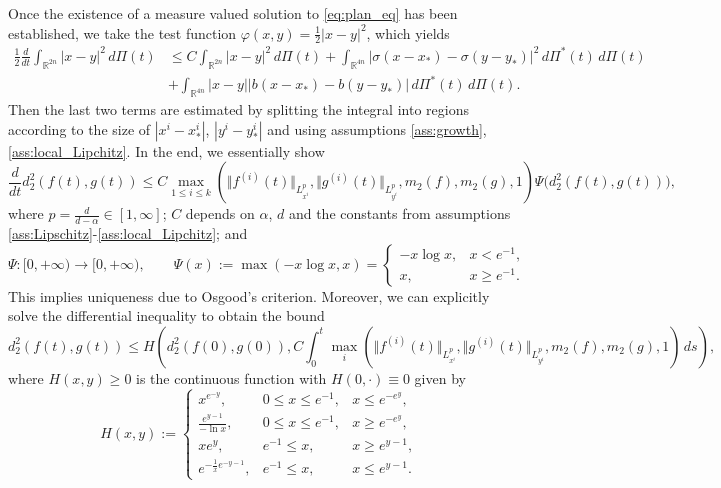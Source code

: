 \documentclass[10pt,oneside]{amsart}
\numberwithin{equation}{section}
\numberwithin{definition}{section}
\numberwithin{theorem}{section}
\numberwithin{lemma}{section}
\begin{document}
% 
Once the existence of a measure valued solution to \cref{eq:plan_eq} has been established, we take the test function ${\varphi(x,y)=\frac{1}{2}|x-y|^2}$, which yields
% 
\begin{align*}
  \frac{1}{2}\frac{d}{dt}\int_{\mathbb R^{2n}}|x-y|^{2}\,d\Pi(t)
  &\leq C\int_{\mathbb R^{2n}}|x-y|^{2}\,d\Pi(t)
  +\int_{\mathbb R^{4n}}\left|\sigma(x-x_{*})-\sigma(y-y_{*})\right|^{2}\,d\Pi^{*}(t)\,d\Pi(t)\\
  &+\int_{\mathbb R^{4n}}|x-y|\left|b(x-x_{*})-b(y-y_{*})\right|\,d\Pi^{*}(t)\,d\Pi(t).
\end{align*}
% 
Then the last two terms are estimated by splitting the integral into regions according to the size of $|x^i-x^i_*|$, $|y^i-y^i_*|$ and using assumptions \ref{ass:growth}, \ref{ass:local_Lipchitz}. In the end, we essentially show
%
\begin{equation*}
  \frac{d}{dt}d_2^2(f(t),g(t)) \leq C
  \max_{1\leq i\leq k}(\Vert f^{(i)}(t)\Vert_{L^p_{x^i}},\Vert g^{(i)}(t)\Vert_{L^p_{y^i}},m_2(f),m_2(g),1)
  \Psi\big(d_2^2(f(t),g(t))\big),
\end{equation*}
%
where $p=\frac{d}{d-\alpha}\in [1,\infty]$; $C$ depends on $\alpha$, $d$ and the constants from assumptions \ref{ass:Lipschitz}-\ref{ass:local_Lipchitz}; and
%
\begin{equation*}
  \Psi:[0,+\infty)\longrightarrow[0,+\infty),\qquad  \Psi(x):=\max(-x\log x, x) = 
  \begin{cases}
    -x\log x, & x<e^{-1},\\ 
    x, & x\geq e^{-1}.
  \end{cases}
\end{equation*}
% 
This implies uniqueness due to Osgood's criterion. Moreover, we can explicitly solve the differential inequality to obtain the bound
%
\begin{equation}\label{eq:gen_bound}
  d_2^2(f(t),g(t)) \leq H\left(d_2^2(f(0),g(0)),
    C \int_{0}^{t}\max_{i}(\Vert f^{(i)}(t)\Vert_{L^p_{x^i}},\Vert g^{(i)}(t)\Vert_{L^p_{y^i}},m_2(f),m_2(g),1) \,ds
  \right),
\end{equation}
%
where $H(x,y)\geq 0$ is the continuous function with $H(0,\cdot)\equiv 0$ given by
%
\begin{equation}\label{eq:Omega}
  H(x,y):=
  \left\{ \begin{array}{ccc}
    x^{e^{-y}}, & 0\leq x\leq e^{-1}, & x\leq e^{-e^{y}},\\
    \frac{e^{y-1}}{-\ln x}, & 0\leq x\leq e^{-1}, & x\geq e^{-e^{y}},\\
    xe^{y}, & e^{-1}\leq x, & x\geq e^{y-1},\\
    e^{-\frac{1}{x}e^{-y-1}}, & e^{-1}\leq x, & x\leq e^{y-1}.
  \end{array}\right.
\end{equation}
\end{document}
